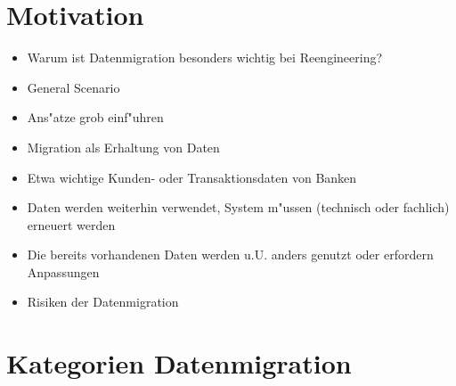 \documentclass[11pt]{scrartcl}
\begin{document}
\section{Motivation}

\begin{itemize}
	\item Warum ist Datenmigration besonders wichtig bei Reengineering?
	\item General Scenario
	\item Ans"atze grob einf"uhren
	\item Migration als Erhaltung von Daten
	\item Etwa wichtige Kunden- oder Transaktionsdaten von Banken
	\item Daten werden weiterhin verwendet, System m"ussen (technisch oder fachlich) erneuert werden
	\item Die bereits vorhandenen Daten werden u.U. anders genutzt oder erfordern Anpassungen
	\item Risiken der Datenmigration
\end{itemize}

\section{Kategorien Datenmigration}
\end{document}

